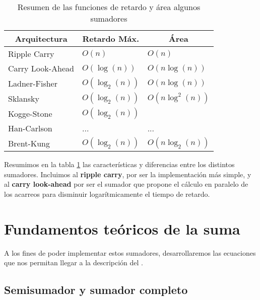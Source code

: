 \begin{table}[h]
\centering
\begin{tabular}{|l|l|l|}
\hline
\multicolumn{1}{|c|}{\textbf{Arquitectura}} & \multicolumn{1}{c|}{\textbf{Retardo Máx.   }} & \multicolumn{1}{c|}{\textbf{Área}} \\ \hline
Ripple Carry  & \(O(n)\) & \(O(n)\) \\ \hline
Carry Look-Ahead  & \(O(\log(n))\) & \(O(n\log(n))\) \\ \hline
Ladner-Fisher &\( O(\log_2(n))\) & \(O(n\log(n))   \) \\ \hline
Sklansky &\( O(\log_2(n))\) & \(O(n\log^2(n))\) \\ \hline
Kogge-Stone & \( O(\log_2(n))\) & \\ \hline
Han-Carlson &... &... \\ \hline 
Brent-Kung & $O(\log_2(n))$ & \(O(n\log_2(n))\) \\ \hline
\end{tabular}
\caption{Resumen de las funciones de retardo y área algunos sumadores}\label{tabla:sumadores}
\end{table}
Resumimos en la tabla \ref{tabla:sumadores} las características y diferencias entre los distintos sumadores\cite{6120598}. Incluimos al \textbf{ripple carry}, por ser la implementación más simple, y al \textbf{carry look-ahead} por ser el sumador que propone el cálculo en paralelo de los acarreos para disminuir logarítmicamente el tiempo de retardo.







\section{Fundamentos teóricos de la suma}
A los fines de poder implementar estos sumadores, desarrollaremos las ecuaciones que nos permitan llegar a la descripción del .

\subsection{Semisumador y sumador completo}
